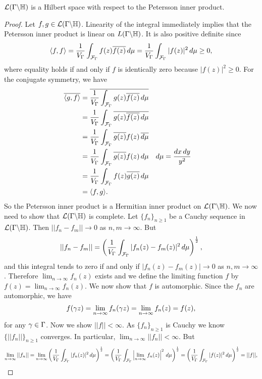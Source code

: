       \begin{theorem}
        $\mathcal{L}(\Gamma\backslash\mathbb{H})$ is a Hilbert space with respect to the Petersson inner product.
      \end{theorem}
      \begin{proof}
        Let $f,g \in \mathcal{L}(\Gamma\backslash\mathbb{H})$. Linearity of the integral immediately implies that the Petersson inner product is linear on $\mathcal{\mathcal}{L}(\Gamma\backslash\mathbb{H})$. It is also positive definite since
        \[
          \langle f,f\rangle = \frac{1}{V_{\Gamma}}\int_{\mathcal{F}_{\Gamma}}f(z)\overline{f(z)}\,d\mu = \frac{1}{V_{\Gamma}}\int_{\mathcal{F}_{\Gamma}}|f(z)|^{2}\,d\mu \ge 0,
        \]
        where equality holds if and only if $f$ is identically zero because $|f(z)|^{2}\ge 0$. For the conjugate symmetry, we have
        \begin{align*}
          \overline{\langle g,f\rangle} &= \overline{\frac{1}{V_{\Gamma}}\int_{\mathcal{F}_{\Gamma}}g(z)\overline{f(z)}\,d\mu} \\
          &= \frac{1}{V_{\Gamma}}\int_{\mathcal{F}_{\Gamma}}\overline{g(z)\overline{f(z)}\,d\mu} \\
          &= \frac{1}{V_{\Gamma}}\int_{\mathcal{F}_{\Gamma}}\overline{g(z)}f(z)\,\overline{d\mu} \\
          &= \frac{1}{V_{\Gamma}}\int_{\mathcal{F}_{\Gamma}}\overline{g(z)}f(z)\,d\mu && \text{$d\mu = \frac{dx\,dy}{y^{2}}$} \\
          &= \frac{1}{V_{\Gamma}}\int_{\mathcal{F}_{\Gamma}}f(z)\overline{g(z)}\,d\mu \\
          &= \langle f,g\rangle.
        \end{align*}
        So the Petersson inner product is a Hermitian inner product on $\mathcal{L}(\Gamma\backslash\mathbb{H})$. We now need to show that $\mathcal{L}(\Gamma\backslash\mathbb{H})$ is complete. Let $\{f_{n}\}_{n \ge 1}$ be a Cauchy sequence in $\mathcal{L}(\Gamma\backslash\mathbb{H})$. Then $||f_{n}-f_{m}|| \to 0$ as $n,m \to \infty$. But
        \[
          ||f_{n}-f_{m}|| = \left(\frac{1}{V_{\Gamma}}\int_{\mathcal{F}_{\Gamma}}|f_{n}(z)-f_{m}(z)|^{2}\,d\mu\right)^{\frac{1}{2}},
        \]
        and this integral tends to zero if and only if $|f_{n}(z)-f_{m}(z)| \to 0$ as $n,m \to \infty$. Therefore $\lim_{n \to \infty}f_{n}(z)$ exists and we define the limiting function $f$ by $f(z) = \lim_{n \to \infty}f_{n}(z)$. We now show that $f$ is automorphic. Since the $f_{n}$ are automorphic, we have
        \[
          f(\gamma z) = \lim_{n \to \infty}f_{n}(\gamma z) = \lim_{n \to \infty}f_{n}(z) = f(z),
        \]
        for any $\gamma \in \Gamma$. Now we show $||f|| < \infty$. As $\{f_{n}\}_{n \ge 1}$ is Cauchy we know $\{||f_{n}||\}_{n \ge 1}$ converges. In particular, $\lim_{n \to \infty}||f_{n}|| < \infty$. But
        \[
          \lim_{n \to \infty}||f_{n}|| = \lim_{n \to \infty}\left(\frac{1}{V_{\Gamma}}\int_{\mathcal{F}_{\Gamma}}|f_{n}(z)|^{2}\,d\mu\right)^{\frac{1}{2}} = \left(\frac{1}{V_{\Gamma}}\int_{\mathcal{F}_{\Gamma}}\left|\lim_{n \to \infty}f_{n}(z)\right|^{2}\,d\mu\right)^{\frac{1}{2}} = \left(\frac{1}{V_{\Gamma}}\int_{\mathcal{F}_{\Gamma}}|f(z)|^{2}\,d\mu\right)^{\frac{1}{2}} = ||f||,
\]
\end{proof}
